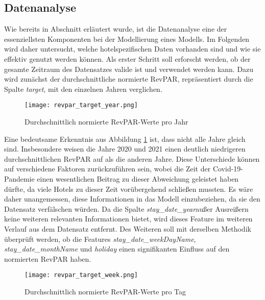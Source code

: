 \subsection{Datenanalyse}
\label{subsec:revpar_analyse}

Wie bereits in Abschnitt \emph{} erläutert wurde, ist die Datenanalyse eine der essenziellsten Komponenten bei der Modellierung eines Modells. Im Folgenden wird daher untersucht, welche hotelspezifischen Daten vorhanden sind und wie sie effektiv genutzt werden können.
\newline
\newline
Als erster Schritt soll erforscht werden, ob der gesamte Zeitraum des Datensatzes valide ist und verwendet werden kann. Dazu wird zunächst der durchschnittliche normierte RevPAR, repräsentiert durch die Spalte \emph{target}, mit den einzelnen Jahren verglichen.

\begin{figure}[h]
    \centering
    \texttt{[image: revpar\_target\_year.png]}
    \caption[Durchschnittlich normierte RevPAR-Werte pro Jahr]{Durchschnittlich normierte RevPAR-Werte pro Jahr}
    \label{img:revpar_target_year}
\end{figure}

Eine bedeutsame Erkenntnis aus Abbildung \ref{img:revpar_target_year} ist, dass nicht alle Jahre gleich sind. Insbesondere weisen die Jahre 2020 und 2021 einen deutlich niedrigeren durchschnittlichen RevPAR auf als die anderen Jahre. Diese Unterschiede können auf verschiedene Faktoren zurückzuführen sein, wobei die Zeit der Covid-19-Pandemie einen wesentlichen Beitrag zu dieser Abweichung geleistet haben dürfte, da viele Hotels zu dieser Zeit vorübergehend schließen mussten. Es wäre daher unangemessen, diese Informationen in das Modell einzubeziehen, da sie den Datensatz verfälschen würden. Da die Spalte 
\emph{stay\_date\_year}außer Ausreißern keine weiteren relevanten Informationen bietet, wird dieses Feature im weiteren Verlauf aus dem Datensatz entfernt.
\newline
\newline
Des Weiteren soll mit derselben Methodik überprüft werden, ob die Features
\newline 
\emph{stay\_date\_weekDayName}, \emph{stay\_date\_monthName} und \emph{holiday} einen signifikanten Einfluss auf den normierten RevPAR haben.

\newpage
\begin{figure}[h]
    \centering
    \texttt{[image: revpar\_target\_week.png]}
    \caption[Durchschnittlich normierte RevPAR-Werte pro Tag]{Durchschnittlich normierte RevPAR-Werte pro Tag}
    \label{img:revpar_target_week}
\end{figure}

